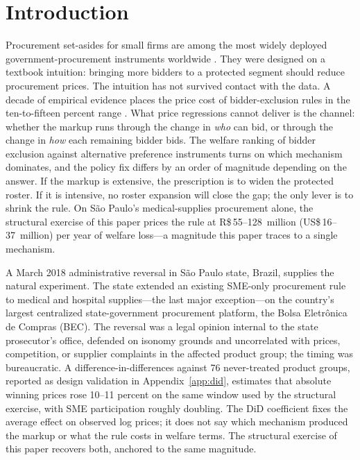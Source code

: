 \section{Introduction}

Procurement set-asides for small firms are among the most widely deployed government-procurement instruments worldwide \citep{bosio2022}. They were designed on a textbook intuition: bringing more bidders to a protected segment should reduce procurement prices. The intuition has not survived contact with the data. A decade of empirical evidence places the price cost of bidder-exclusion rules in the ten-to-fifteen percent range \citep{marion2007, krasnokutskaya2011, athey2013, nakabayashi2013, hyytinen2018}. What price regressions cannot deliver is the channel: whether the markup runs through the change in \emph{who} can bid, or through the change in \emph{how} each remaining bidder bids. The welfare ranking of bidder exclusion against alternative preference instruments turns on which mechanism dominates, and the policy fix differs by an order of magnitude depending on the answer. If the markup is extensive, the prescription is to widen the protected roster. If it is intensive, no roster expansion will close the gap; the only lever is to shrink the rule. On São Paulo's medical-supplies procurement alone, the structural exercise of this paper prices the rule at R\$\,55--128~million (US\$\,16--37~million) per year of welfare loss---a magnitude this paper traces to a single mechanism.

A March 2018 administrative reversal in S\~ao Paulo state, Brazil, supplies the natural experiment. The state extended an existing SME-only procurement rule to medical and hospital supplies---the last major exception---on the country's largest centralized state-government procurement platform, the Bolsa Eletr\^onica de Compras (BEC). The reversal was a legal opinion internal to the state prosecutor's office, defended on isonomy grounds and uncorrelated with prices, competition, or supplier complaints in the affected product group; the timing was bureaucratic. A difference-in-differences against 76 never-treated product groups, reported as design validation in Appendix~\ref{app:did}, estimates that absolute winning prices rose 10--11 percent on the same window used by the structural exercise, with SME participation roughly doubling. The DiD coefficient fixes the average effect on observed log prices; it does not say which mechanism produced the markup or what the rule costs in welfare terms. The structural exercise of this paper recovers both, anchored to the same magnitude.

